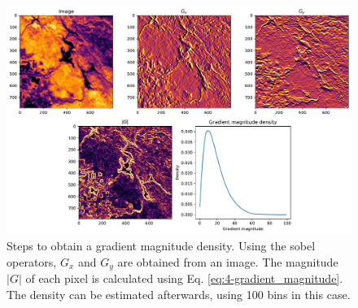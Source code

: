          \begin{figure}[H]
             \centering
             \includegraphics[width=\textwidth]{Includes/4-gradient-analysis.pdf}
             \caption{Steps to obtain a gradient magnitude density. Using the sobel operators, $G_x$ and $G_y$ are obtained from an image. The magnitude $|G|$ of each pixel is calculated using Eq. \ref{eq:4-gradient_magnitude}. The density can be estimated afterwards, using 100 bins in this case.}
             \label{fig:4-gradient-analysis}
         \end{figure}

         

\clearpage

        

        
        
